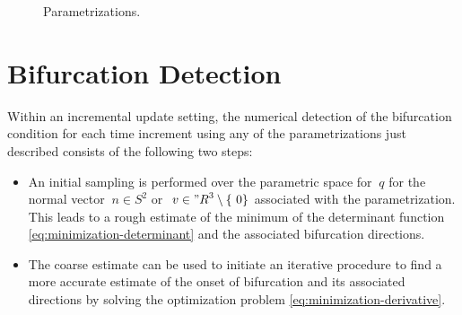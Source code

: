 \documentclass[12pt]{article}
\numberwithin{equation}{section}
\begin{document}
\begin{figure}[htbp]
\begin{center}
    \caption{Parametrizations.}
    \label{fig:parametrizations}
  \end{center}
\end{figure}

\section{Bifurcation Detection}
\label{sec:detection}

Within an incremental update setting, the numerical detection of the
bifurcation condition for each time increment using any of the
parametrizations just described consists of the following two steps:

\begin{itemize}

\item An initial sampling is performed over the parametric space for
  $~q$ for the normal vector $~n \in S^2$ or $~v \in {"R}^3 \setminus
  \{~0\}$ associated with the parametrization. This leads to a rough
  estimate of the minimum of the determinant function
  \eqref{eq:minimization-determinant} and the associated bifurcation
  directions.

\item The coarse estimate can be used to initiate an iterative
  procedure to find a more accurate estimate of the onset of
  bifurcation and its associated directions by solving the
  optimization problem \eqref{eq:minimization-derivative}.

\end{itemize}
\end{document}
